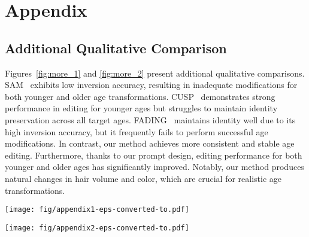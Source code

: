 \section*{Appendix}
\label{sec:appendix_section}
\renewcommand{\thesubsection}{\Alph{subsection}}
\setcounter{subsection}{0}
\subsection{Additional Qualitative Comparison}
Figures~\ref{fig:more_1} and \ref{fig:more_2} present additional qualitative comparisons.
SAM~\cite{alaluf2021only} exhibits low inversion accuracy, resulting in inadequate modifications for both younger and older age transformations.
CUSP~\cite{gomez2022custom} demonstrates strong performance in editing for younger ages but struggles to maintain identity preservation across all target ages.
FADING~\cite{chen2023face} maintains identity well due to its high inversion accuracy, but it frequently fails to perform successful age modifications.
In contrast, our method achieves more consistent and stable age editing.
Furthermore, thanks to our prompt design, editing performance for both younger and older ages has significantly improved.
Notably, our method produces natural changes in hair volume and color, which are crucial for realistic age transformations.

\begin{figure*}[h]
  \centering
  \texttt{[image: fig/appendix1-eps-converted-to.pdf]}
  \caption{
  Additional qualitative comparison between our method and the existing methods~\cite{alaluf2021only,gomez2022custom,chen2023face}.
  }
  \label{fig:more_1}
\end{figure*}

\begin{figure*}[h]
  \centering
  \texttt{[image: fig/appendix2-eps-converted-to.pdf]}
  \caption{
  Additional qualitative comparison between our method and the existing methods~\cite{alaluf2021only,gomez2022custom,chen2023face}.
  }
  \label{fig:more_2}
\end{figure*}